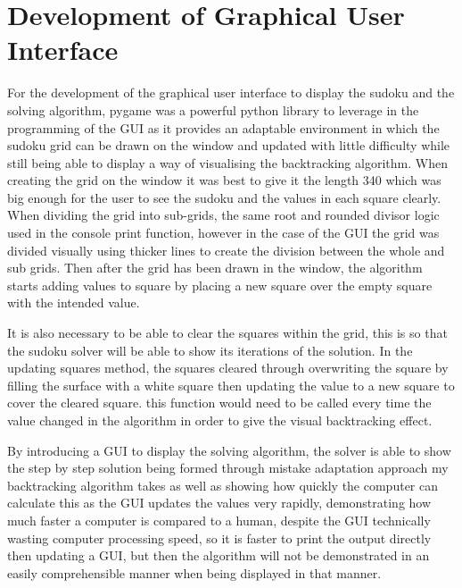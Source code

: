 \documentclass[]{final_report}
\begin{document}
\section{Development of Graphical User Interface}

For the development of the graphical user interface to display the sudoku and the solving algorithm, pygame was a powerful python library to leverage in the programming of the GUI as it provides an adaptable environment in which the sudoku grid can be drawn on the window and updated with little difficulty while still being able to display a way of visualising the backtracking algorithm. When creating the grid on the window it was best to give it the length 340 which was big enough for the user to see the sudoku and the values in each square clearly. When dividing the grid into sub-grids, the same root and rounded divisor logic used in the console print function, however in the case of the GUI the grid was divided visually using thicker lines to create the division between the whole and sub grids. Then after the grid has been drawn in the window, the algorithm starts adding values to square by placing a new square over the empty square with the intended value. 

It is also necessary to be able to clear the squares within the grid, this is so that the sudoku solver will be able to show its iterations of the solution. In the updating squares method, the squares cleared through overwriting the square by filling the surface with a white square then updating the value to a new square to cover the cleared square. this function would need to be called every time the value changed in the algorithm in order to give the visual backtracking effect. 

By introducing a GUI to display the solving algorithm, the solver is able to show the step by step solution being formed through mistake adaptation approach my backtracking algorithm takes as well as showing how quickly the computer can calculate this as the GUI updates the values very rapidly, demonstrating how much faster a computer is compared to a human, despite the GUI technically wasting computer processing speed, so it is faster to print the output directly then updating a GUI, but then the algorithm will not be demonstrated in an easily comprehensible manner when being displayed in that manner.
\end{document}
